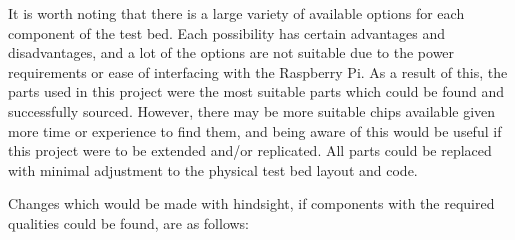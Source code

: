 \documentclass[../main.tex]{subfiles}
\begin{document}

It is worth noting that there is a large variety of available options for each component of the test bed.
Each possibility has certain advantages and disadvantages, and a lot of the options are not suitable due to the power requirements or ease of interfacing with the Raspberry Pi.
As a result of this, the parts used in this project were the most suitable parts which could be found and successfully sourced.
However, there may be more suitable chips available given more time or experience to find them, and being aware of this would be useful if this project were to be extended and/or replicated.
All parts could be replaced with minimal adjustment to the physical test bed layout and code.\\

\newpage

Changes which would be made with hindsight, if components with the required qualities could be found, are as follows:
\end{document}
